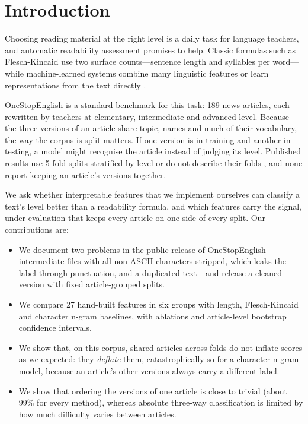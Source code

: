 \section{Introduction}

Choosing reading material at the right level is a daily task for language teachers, and automatic readability assessment promises to help. Classic formulas such as Flesch-Kincaid \citep{kincaid1975derivation} use two surface counts---sentence length and syllables per word---while machine-learned systems combine many linguistic features \citep{schwarm2005reading,feng2010comparison} or learn representations from the text directly \citep{martinc2021supervised,lee2021pushing}.

OneStopEnglish \citep{vajjala2018onestop} is a standard benchmark for this task: 189 news articles, each rewritten by teachers at elementary, intermediate and advanced level. Because the three versions of an article share topic, names and much of their vocabulary, the way the corpus is split matters. If one version is in training and another in testing, a model might recognise the article instead of judging its level. Published results use 5-fold splits stratified by level \citep{martinc2021supervised,lee2021pushing} or do not describe their folds \citep{vajjala2018onestop}, and none report keeping an article's versions together.

We ask whether interpretable features that we implement ourselves can classify a text's level better than a readability formula, and which features carry the signal, under evaluation that keeps every article on one side of every split. Our contributions are:
\begin{itemize}
\setlength\itemsep{0pt}
\item We document two problems in the public release of OneStopEnglish---intermediate files with all non-ASCII characters stripped, which leaks the label through punctuation, and a duplicated text---and release a cleaned version with fixed article-grouped splits.
\item We compare 27 hand-built features in six groups with length, Flesch-Kincaid and character n-gram baselines, with ablations and article-level bootstrap confidence intervals.
\item We show that, on this corpus, shared articles across folds do not inflate scores as we expected: they \emph{deflate} them, catastrophically so for a character n-gram model, because an article's other versions always carry a different label.
\item We show that ordering the versions of one article is close to trivial (about 99\% for every method), whereas absolute three-way classification is limited by how much difficulty varies between articles.
\end{itemize}

